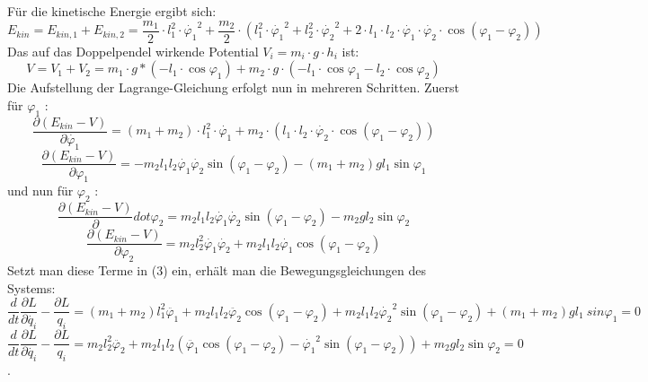 Für die kinetische Energie ergibt sich:
\begin{equation}
E_{kin} = E_{kin,1} + E_{kin,2} = \frac{m_1}{2} \cdot  l_1^2 \cdot  \dot{\varphi_1}^2 +
\frac{m_2}{2} \cdot (l_1^2 \cdot \dot{\varphi_1}^2 + l_2^2 \cdot \dot{\varphi_2}^2 + 2 \cdot l_1 \cdot l_2 \cdot \dot{\varphi_1} \cdot \dot{\varphi_2} \cdot \cos (\varphi_1 - \varphi_2))
\end{equation}
Das auf das Doppelpendel wirkende Potential $ V_i = m_i \cdot g \cdot h_i $ ist:
\begin{equation}
V = V_1 + V_2 = m_1 \cdot g * (-l_1 \cdot \cos \varphi_1) + m_2 \cdot g \cdot (-l_1 \cdot \cos \varphi_1 - l_2 \cdot \cos \varphi_2)
\end{equation}
Die Aufstellung der Lagrange-Gleichung erfolgt nun in mehreren Schritten. Zuerst für $ \varphi_1$ :
\begin{equation}
\frac{\partial (E_{kin} - V)}{\partial\dot{\varphi_1}} = (m_1 + m_2) \cdot l_1^2 \cdot \dot{\varphi_1} + m_2 \cdot (l_1 \cdot l_2 \cdot \dot{\varphi_2} \cdot \cos (\varphi_1 - \varphi_2)) 
\end{equation}
\begin{equation}
\frac{\partial (E_{kin} - V)}{\partial \varphi_1} = -m_2 l_1 l_2 \dot{\varphi_1} \dot{\varphi_2} \sin (\varphi_1 - \varphi_2) - (m_1 + m_2) g l_1 \sin \varphi_1
\end{equation}
und nun für $ \varphi_2 $ :
\begin{equation}
\frac{\partial (E_{kin} - V)}{\partial }dot{\varphi_2} = m_2 l_1 l_2 \dot{\varphi_1} \dot{\varphi_2} \sin (\varphi_1 - \varphi_2) - m_2 g l_2 \sin \varphi_2
\end{equation}
\begin{equation}
\frac{\partial (E_{kin} - V)}{\partial \varphi_2} = m_2 l_2^2 \dot{\varphi_1} \dot{\varphi_2} + m_2 l_1 l_2 \dot{\varphi_1} \cos (\varphi_1 - \varphi_2)
\end{equation}
Setzt man diese Terme in (3) ein, erhält man die Bewegungsgleichungen des Systems:
\begin{equation}
\frac{d}{dt}\frac{\partial L}{\partial\dot{q_i}}-\frac{\partial L}{q_i} = (m_1 + m_2) l_1^2\ddot{\varphi_1} + m_2 l_1 l_2 \ddot{\varphi_2} \cos (\varphi_1 - \varphi_2) + m_2 l_1 l_2 \dot{\varphi_2}^2 \sin (\varphi_1 - \varphi_2) + (m_1 + m_2) g l_1 \ sin \varphi_1 = 0
\end{equation}
\begin{equation}
\frac{d}{dt}\frac{\partial L}{\partial\dot{q_i}}-\frac{\partial L}{q_i} = m_2 l_2^2 \ddot{\varphi_2} + m_2 l_1 l_2 (\ddot{\varphi_1} \cos (\varphi_1 - \varphi_2) - \dot{\varphi_1}^2 \sin (\varphi_1 - \varphi_2)) + m_2 g l_2 \sin \varphi_2 = 0
\end{equation}. 
